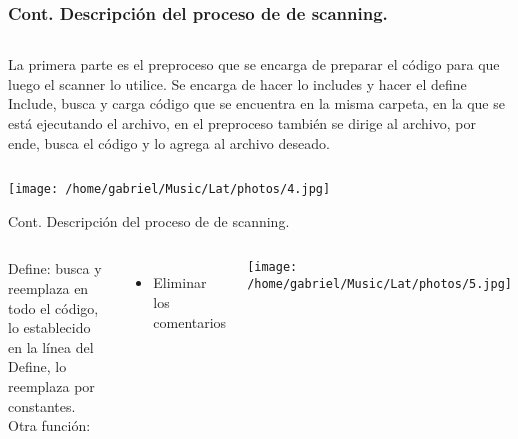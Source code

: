 \documentclass{beamer}
\begin{document}
\begin{frame}
\frametitle{Cont. Descripción del proceso de de scanning.}


\begin{columns}
La primera parte es el preproceso que se encarga de preparar el código para que luego el scanner lo utilice.
Se encarga de hacer lo includes y hacer el define\\ 





Include, busca y carga código que se encuentra en la misma carpeta, en la que se está ejecutando el archivo, en el preproceso también se dirige al archivo, por ende, busca el código y lo agrega al archivo  deseado.\\
\end{columns}

\begin{center}
    \texttt{[image: /home/gabriel/Music/Lat/photos/4.jpg]}
\end{center}

\end{frame}



\begin{frame}{Cont. Descripción del proceso de de scanning.}
\begin{columns}

Define: busca y reemplaza en todo el código, lo establecido en la línea del Define, lo reemplaza por constantes.\\
Otra función:\\
\begin{itemize}
\item Eliminar los comentarios 
\end{itemize}


\begin{center}
    \texttt{[image: /home/gabriel/Music/Lat/photos/5.jpg]}
\end{center}

\end{columns}
\end{frame}
\end{document}
